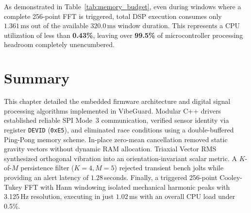 As demonstrated in Table~\ref{tab:memory_budget}, even during windows where a complete 256-point FFT is triggered, total DSP execution consumes only $1.361\,\text{ms}$ out of the available $320.0\,\text{ms}$ window duration. This represents a CPU utilization of less than \textbf{0.43\%}, leaving over \textbf{99.5\%} of microcontroller processing headroom completely unencumbered.

\section{Summary}
This chapter detailed the embedded firmware architecture and digital signal processing algorithms implemented in VibeGuard. Modular C++ drivers established reliable SPI Mode~3 communication, verified sensor identity via register \texttt{DEVID} (\texttt{0xE5}), and eliminated race conditions using a double-buffered Ping-Pong memory scheme. In-place zero-mean cancellation removed static gravity vectors without dynamic RAM allocation. Triaxial Vector RMS synthesized orthogonal vibration into an orientation-invariant scalar metric. A $K$-of-$M$ persistence filter ($K=4, M=5$) rejected transient bench jolts while providing an alert latency of $1.28$\,seconds. Finally, a triggered 256-point Cooley-Tukey FFT with Hann windowing isolated mechanical harmonic peaks with 3.125\,Hz resolution, executing in just $1.02$\,ms with an overall CPU load under 0.5\%.
